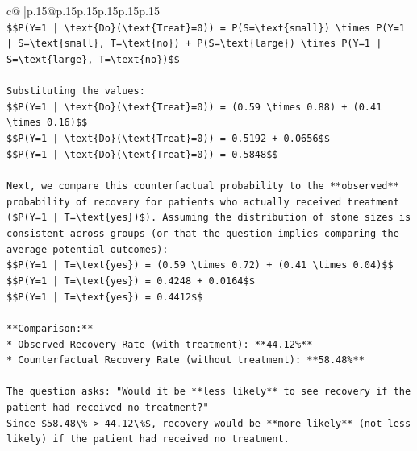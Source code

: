 \documentclass{article}
\begin{document}
{\begin{supertabular}{c@{$\;$}|p{.15\linewidth}@{}p{.15\linewidth}p{.15\linewidth}p{.15\linewidth}p{.15\linewidth}p{.15\linewidth}}
{{{\\ 
\texttt{\$\$P(Y=1 | \textbackslash{}text\{Do\}(\textbackslash{}text\{Treat\}=0)) = P(S=\textbackslash{}text\{small\}) \textbackslash{}times P(Y=1 | S=\textbackslash{}text\{small\}, T=\textbackslash{}text\{no\}) + P(S=\textbackslash{}text\{large\}) \textbackslash{}times P(Y=1 | S=\textbackslash{}text\{large\}, T=\textbackslash{}text\{no\})\$\$} \\
\\ 
\texttt{Substituting the values:} \\
\texttt{\$\$P(Y=1 | \textbackslash{}text\{Do\}(\textbackslash{}text\{Treat\}=0)) = (0.59 \textbackslash{}times 0.88) + (0.41 \textbackslash{}times 0.16)\$\$} \\
\texttt{\$\$P(Y=1 | \textbackslash{}text\{Do\}(\textbackslash{}text\{Treat\}=0)) = 0.5192 + 0.0656\$\$} \\
\texttt{\$\$P(Y=1 | \textbackslash{}text\{Do\}(\textbackslash{}text\{Treat\}=0)) = 0.5848\$\$} \\
\\ 
\texttt{Next, we compare this counterfactual probability to the **observed** probability of recovery for patients who actually received treatment (\$P(Y=1 | T=\textbackslash{}text\{yes\})\$). Assuming the distribution of stone sizes is consistent across groups (or that the question implies comparing the average potential outcomes):} \\
\texttt{\$\$P(Y=1 | T=\textbackslash{}text\{yes\}) = (0.59 \textbackslash{}times 0.72) + (0.41 \textbackslash{}times 0.04)\$\$} \\
\texttt{\$\$P(Y=1 | T=\textbackslash{}text\{yes\}) = 0.4248 + 0.0164\$\$} \\
\texttt{\$\$P(Y=1 | T=\textbackslash{}text\{yes\}) = 0.4412\$\$} \\
\\ 
\texttt{**Comparison:**} \\
\texttt{*   Observed Recovery Rate (with treatment): **44.12\%**} \\
\texttt{*   Counterfactual Recovery Rate (without treatment): **58.48\%**} \\
\\ 
\texttt{The question asks: "Would it be **less likely** to see recovery if the patient had received no treatment?"} \\
\texttt{Since \$58.48\textbackslash{}\% > 44.12\textbackslash{}\%\$, recovery would be **more likely** (not less likely) if the patient had received no treatment.} \\
}}}
\end{supertabular}}
\end{document}
